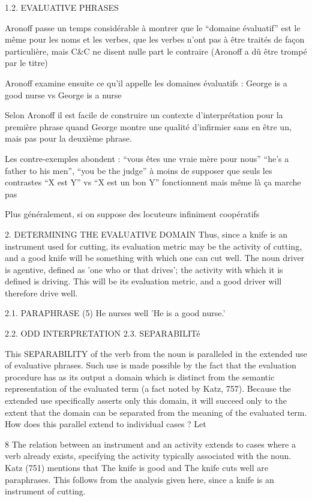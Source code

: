 \documentclass[a4paper,12pt]{article}
\begin{document}
 
 1.2. EVALUATIVE PHRASES
 
 
 Aronoff passe un temps considérable à montrer que le ``domaine évaluatif'' est le même pour les noms et les verbes, que les verbes n'ont pas 
 à être traités de façon particulière, mais C\&C ne disent nulle part le contraire (Aronoff a dû être trompé par le titre) 
 
   
Aronoff examine ensuite ce qu'il appelle les domaines évaluatifs : 
George is a good nurse vs George is a nurse

Selon Aronoff il est facile de construire un contexte d'interprétation pour la première phrase quand George montre une qualité d'infirmier sans en être
un, mais pas pour la deuxième phrase. 




Les contre-exemples abondent : 
``vous êtes une vraie mère pour nous'' ``he's a father to his men'', ``you be the judge'' 
à moins de supposer que seuls les contrastes ``X est Y'' vs ``X est un bon Y'' fonctionnent mais même là ça marche pas

Plus généralement, si on suppose des locuteurs infiniment coopératifs 
 
 2. DETERMINING THE EVALUATIVE DOMAIN
  Thus, since a knife is an instrument used for cutting, its evaluation
metric may be the activity of cutting, and a good knife will be something with which
one can cut well. The noun driver is agentive, defined as 'one who or that drives';
the activity with which it is defined is driving. This will be its evaluation metric, and
a good driver will therefore drive well.

 2.1. PARAPHRASE
 (5) He nurses well 'He is a good nurse.'
 
 2.2. ODD INTERPRETATION
 2.3. SEPARABILITé
 
 This SEPARABILITY of the verb from the noun is paralleled in the extended use of
evaluative phrases. Such use is made possible by the fact that the evaluation procedure
has as its output a domain which is distinct from the semantic representation
of the evaluated term (a fact noted by Katz, 757). Because the extended use specifically
asserts only this domain, it will succeed only to the extent that the domain can
be separated from the meaning of the evaluated term.
How does this parallel extend to individual cases ? Let 

8 The relation between an instrument and an activity extends to cases where a verb already
exists, specifying the activity typically associated with the noun. Katz (751) mentions that The
knife is good and The knife cuts well are paraphrases. This follows from the analysis given here,
since a knife is an instrument of cutting.
\end{document}
